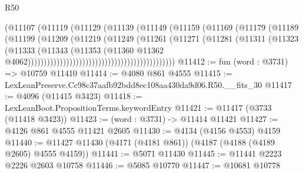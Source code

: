 \begin{lexlean}{R50}
\begin{coremodule}
                                                    (@11107
                                                      (@11119
                                                        (@11129
                                                          (@11139
                                                            (@11149
                                                              (@11159
                                                                (@11169
                                                                  (@11179
                                                                    (@11189
                                                                      (@11199
                                                                        (@11209
                                                                          (@11219
                                                                            (@11249
                                                                              (@11261
                                                                                (@11271
                                                                                  (@11281
                                                                                    (@11311
                                                                                      (@11323
                                                                                        (@11333
                                                                                          (@11343
                                                                                            (@11353
                                                                                              (@11360
                                                                                                @11362
                                                                                                @4062))))))))))))))))))))))))))))))))))))))))))))))
@11412 := fun (word : @3731) => @10759 @11410
@11414 := @4080 @861 @4555
@11415 := LexLeanPreserve.Cc98c37aafb92bdd8ec108aa430da9d06.R50.__fits_30
@11417 := @4096 (@11415 @3423)
@11418 := LexLeanBoot.PropositionTerms.keywordEntry
@11421 := @11417 (@3733 (@11418 @3423))
@11423 := (word : @3731) -> @11414 @11421
@11427 := @4126 @861 @4555 @11421 @2605
@11430 := @4134 (@4156 @4553) @4159
@11440 := @11427 @11430 (@4171 (@4181 @861)) (@4187 (@4188 (@4189 @2605) @4555 @4159))
@11441 := @5071 @11430
@11445 := @11441 @2223 @2226 @2603 @10758
@11446 := @5085 @10770
@11447 := @10681 @10778

\end{coremodule}
\end{lexlean}
